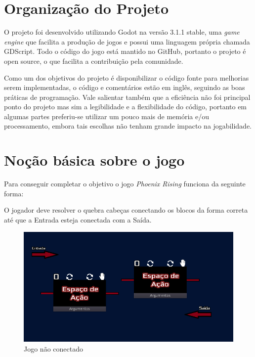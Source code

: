 \section{Organização do Projeto}
\label{sec:consideracoes_preliminares}

O projeto foi desenvolvido utilizando Godot na versão 3.1.1 stable, 
uma \textit{game engine} que facilita a produção de jogos e possui uma linguagem
própria chamada GDScript.
Todo o código do jogo está mantido no GitHub, portanto o projeto é open source,
o que facilita a contribuição pela comunidade.

Como um dos objetivos do projeto é disponibilizar o código fonte para
melhorias serem implementadas, o código e comentários estão em inglês, seguindo
as boas práticas de programação. Vale salientar também que a eficiência não foi
principal ponto do projeto mas sim a legibilidade e a flexibilidade do 
código, portanto em algumas partes preferiu-se utilizar um pouco mais de memória
e/ou processamento, embora tais escolhas não tenham grande impacto na 
jogabilidade.

\section{Noção básica sobre o jogo}
\label{sec:consideracoes_preliminares}

Para conseguir completar o objetivo o jogo \textit{Phoenix Rising} funciona
da seguinte forma:

O jogador deve resolver o quebra cabeças conectando os blocos da forma correta
até que a Entrada esteja conectada com a Saída.

\begin{figure}[H]
    \includegraphics[width=\textwidth]{../figuras/jogo_nao_conectado.png}
    \caption{Jogo não conectado}
\end{figure}

